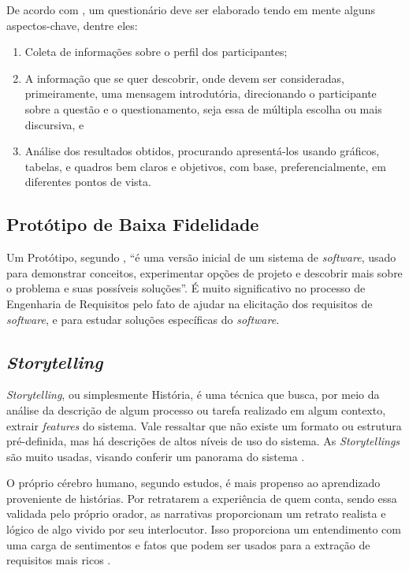 De acordo com \cite{segundo2017custom}, um questionário deve ser elaborado tendo em mente alguns aspectos-chave, dentre eles: 

\begin{enumerate}
    \item Coleta de informações sobre o perfil dos participantes; 
    \item A informação que se quer descobrir, onde devem ser consideradas, primeiramente, uma mensagem  introdutória, direcionando o participante sobre a questão e o questionamento, seja essa de múltipla escolha ou mais discursiva, e
    \item Análise dos resultados obtidos, procurando apresentá-los usando gráficos, tabelas, e quadros bem claros e objetivos, com base, preferencialmente, em diferentes pontos de vista.
\end{enumerate}

\subsection{Protótipo de Baixa Fidelidade}

\label{sec:prototipo-def}

Um Protótipo, segundo \cite{Sommerville10}, “é uma versão inicial de um sistema de \textit{software}, usado para demonstrar conceitos, experimentar opções de projeto e descobrir mais sobre o problema e suas possíveis soluções”. É muito significativo no processo de Engenharia de Requisitos pelo fato de ajudar na elicitação dos requisitos de \textit{software}, e para estudar soluções específicas do \textit{software}.

\subsection{\textit{Storytelling}}

\label{sec:storytelling}

\textit{Storytelling}, ou simplesmente História, é uma técnica que busca, por meio da análise da descrição de algum processo ou tarefa realizado em algum contexto, extrair \textit{features} do sistema. Vale ressaltar que não existe um formato ou estrutura pré-definida, mas há descrições de altos níveis de uso do sistema. As \textit{Storytellings} são muito usadas, visando conferir um panorama do sistema  \cite{Sommerville10}.

O próprio cérebro humano, segundo estudos, é mais propenso ao aprendizado proveniente de histórias. Por retratarem a experiência de quem conta, sendo essa validada pelo próprio orador, as narrativas proporcionam um retrato realista e lógico de algo vivido por seu interlocutor. Isso proporciona um entendimento com uma carga de sentimentos e fatos que podem ser usados para a extração de requisitos mais ricos  \cite{storytelling}.

